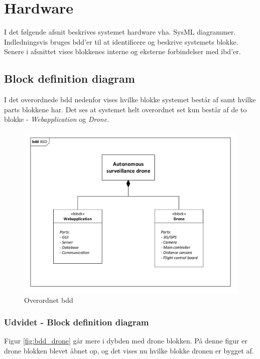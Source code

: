 \chapter{Hardware}

I det følgende afsnit beskrives systemet hardware vha. SysML diagrammer. 
Indledningsvis bruges bdd'er til at identificere og beskrive systemets blokke. Senere i afsnittet vises blokkenes interne og eksterne forbindelser med ibd'er.

\section{Block definition diagram}
I det overordnede bdd nedenfor vises hvilke blokke systemet består af samt hvilke parts blokkene har. Det ses at systemet helt overordnet set kun består af de to blokke - \textit{Webapplication} og \textit{Drone}. 

\begin{figure}[H]
\centering
\includegraphics[width=1\textwidth]{Billeder/BDD/bdd_overordnet.pdf}
\caption{Overordnet bdd}
\label{fig:bdd_overordnet}
\end{figure}

\newpage
\subsection{Udvidet - Block definition diagram}
Figur \ref{fig:bdd_drone} går mere i dybden med drone blokken. På denne figur er drone blokken blevet åbnet op, og det vises nu hvilke blokke dronen er bygget af. 

